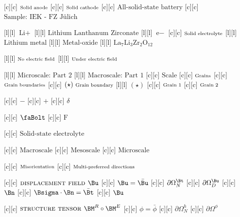 [c][c] {$\text{\scriptsize Solid anode}$}
[c][c] {$\text{\scriptsize Solid cathode}$}
[c][c] {$\text{All-solid-state battery}$}
[c][c] {$\text{Sample: IEK - FZ Jülich}$}

[l][l] {$\text{Li}+$}
[l][l] {$\text{Lithium Lanthanum Zirconate}$}
[l][l] {$\text{e}-$}
[c][c] {$\text{\scriptsize Solid electrolyte}$}
[l][l] {$\text{Lithium metal}$}
[l][l] {$\text{Metal-oxide}$}
[l][l] {$\text{La}_{7}\text{Li}_{3}\text{Zr}_{2}\text{O}_{12}$}

[l][l] {$\text{\scriptsize  No electric field}$}
[l][l] {$\text{\scriptsize  Under electric field}$}

[l][l] {$\text{Microscale: Part 2}$}
[l][l] {$\text{Macroscale: Part 1}$}
[c][c] {$\text{Scale}$}
[c][c] {$\text{\scriptsize Grains}$}
[c][c] {$\text{\scriptsize Grain boundaries}$}
[c][c] {$(\star)\ \text{\scriptsize Grain boundary}$}
[l][l] {$(\star)$}
[c][c] {$\text{\scriptsize Grain 1}$}
[c][c] {$\text{\scriptsize Grain 2}$}

[c][c] {$-$}
[c][c] {$+$}
[c][c] {$\delta$}

[c][c] {$\text{\faBolt}$}
[c][c] {$\text{F}$}

[c][c] {$\text{Solid-state electrolyte}$}

[c][c] {$\text{Macroscale}$}
[c][c] {$\text{Mesoscale}$}
[c][c] {$\text{Microscale}$}


[c][c] {$\text{\scriptsize Misorientation}$}
[c][c] {$\text{\scriptsize Multi-preferred directions}$}

[c][c] {$\textsc{displacement field } \Bu$}
[c][c] {$\Bu=\bar{\Bu}$}
[c][c] {$\partial\Omega^{\Bt}_{N}$}
[c][c] {$\partial\Omega^{\Bu}_{D}$}
[c][c] {$\Bn$}
[c][c] {$\Bsigma\cdot\Bn = \bar{\Bt}$}
[c][c] {$\Bu$}


[c][c] {$\textsc{structure tensor } \BM^{R} \circ \BM^{E}$}
[c][c] {$\phi=\bar{\phi}$}
[c][c] {$\partial\Omega^{h}_{N}$}
[c][c] {$\partial\Omega^{\phi}$}

